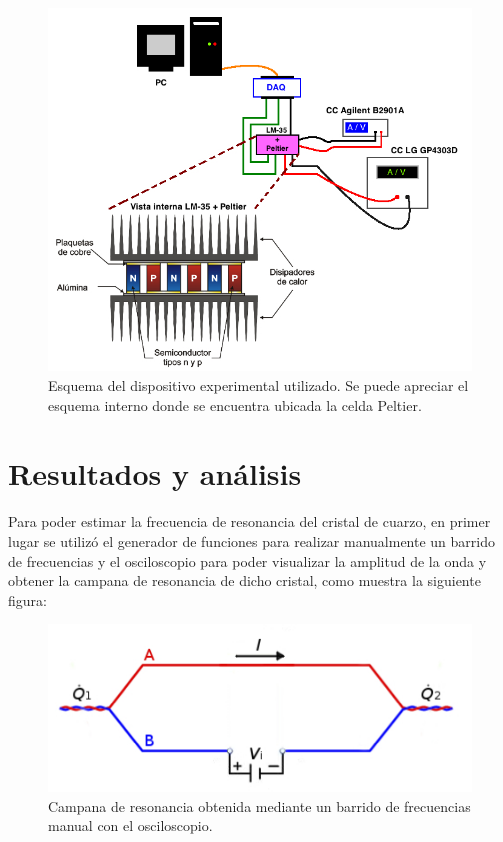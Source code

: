 \documentclass[twoside,twocolumn,a4paper]{article}
\begin{document}
\begin{figure}[H]
\includegraphics[width=\linewidth]{dispexp.jpg}
\caption{Esquema del dispositivo experimental utilizado. Se puede apreciar el esquema interno donde se encuentra ubicada la celda Peltier.}
\label{fig:dispexp2}
\end{figure}


\section{Resultados y an\'alisis}

Para poder estimar la frecuencia de resonancia del cristal de cuarzo, en primer lugar se utiliz\'o el generador de funciones para realizar manualmente un barrido de frecuencias y el osciloscopio para poder visualizar la amplitud de la onda y obtener la campana de resonancia de dicho cristal, como muestra la siguiente figura:

\begin{figure}[H]
\includegraphics[width=\linewidth]{peltier.jpg}
\caption{Campana de resonancia obtenida mediante un barrido de frecuencias manual con el osciloscopio.}
\label{fig:detallecampanaOSC}
\end{figure}
\end{document}
